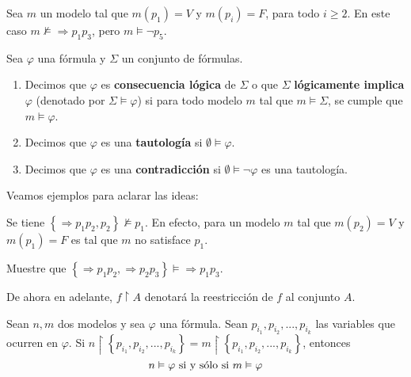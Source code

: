 \documentclass[12pt]{report}
\theoremstyle{largebreak}
\begin{document}
    \begin{exa}
        Sea $m$ un modelo tal que $m(p_1)=V$ y $m(p_i)=F$, para todo $i\geq2$. En este caso $m\nvDash \Rightarrow p_1p_3$, pero $m\vDash \neg p_5$.
    \end{exa}

    \begin{mydef}
        Sea $\varphi$ una fórmula y $\Sigma$ un conjunto de fórmulas.
        \begin{enumerate}
            \item Decimos que $\varphi$ es \textbf{consecuencia lógica} de $\Sigma$ o que $\Sigma$ \textbf{lógicamente implica} $\varphi$ (denotado por $\Sigma\vDash\varphi$) si para todo modelo $m$ tal que $m\vDash\Sigma$, se cumple que $m\vDash\varphi$.
            \item Decimos que $\varphi$ es una \textbf{tautología} si $\emptyset\vDash\varphi$.
            \item Decimos que $\varphi$ es una \textbf{contradicción} si $\emptyset\vDash\neg\varphi$ es una tautología.
        \end{enumerate}
    \end{mydef}

    Veamos ejemplos para aclarar las ideas:

    \begin{exa}
        Se tiene $\left\{\Rightarrow p_1p_2,p_2 \right\}\nvDash p_1$. En efecto, para un modelo $m$ tal que $m(p_2)=V$ y $m(p_1)=F$ es tal que $m$ no satisface $p_1$.
    \end{exa}

    \begin{exa}
        Muestre que $\left\{\Rightarrow p_1p_2,\Rightarrow p_2p_3 \right\}\vDash\Rightarrow p_1p_3$.
    \end{exa}

    \newcommand{\rest}{\ensuremath{\upharpoonright}}

    \begin{obs}
        De ahora en adelante, $f\rest A$ denotará la reestricción de $f$ al conjunto $A$.
    \end{obs}

    \begin{lema}
        Sean $n,m$ dos modelos y sea $\varphi$ una fórmula. Sean $p_{ i_1},p_{ i_2},...,p_{ i_k}$ las variables que ocurren en $\varphi$. Si $n\rest\left\{p_{ i_1},p_{ i_2},...,p_{ i_k}\right\}=m\rest\left\{p_{ i_1},p_{ i_2},...,p_{ i_k}\right\}$, entonces
        \begin{equation*}
            n\vDash \varphi\textup{ si y sólo si } m\vDash\varphi
        \end{equation*}
    \end{lema}
\end{document}
